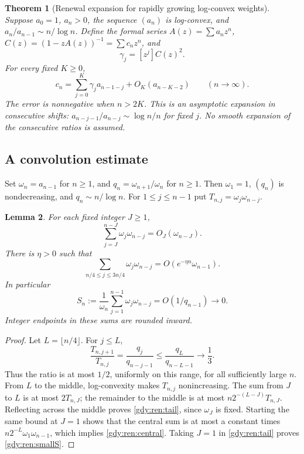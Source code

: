 \documentclass[11pt]{article}
\numberwithin{equation}{section}
\newtheorem{theorem}{Theorem}[section]
\newtheorem{lemma}[theorem]{Lemma}
\theoremstyle{definition}
\theoremstyle{remark}
\begin{document}
\begin{theorem}[Renewal expansion for rapidly growing log-convex weights]
\label{gdy:ren:theorem}
Suppose $a_0=1$, $a_n>0$, the sequence $(a_n)$ is log-convex, and
$a_n/a_{n-1}\sim n/\log n$. Define the formal series
$A(z)=\sum a_nz^n$, $C(z)=(1-zA(z))^{-1}=\sum c_nz^n$, and
\begin{equation}\label{gdy:ren:d}
 \gamma_j=[z^j]C(z)^2.
\end{equation}
For every fixed $K\ge0$,
\begin{equation}\label{gdy:ren:expansion}
 c_n=\sum_{j=0}^{K}\gamma_j a_{n-1-j}
       +O_K(a_{n-K-2})\qquad(n\to\infty).
\end{equation}
The error is nonnegative when $n>2K$. This is an asymptotic expansion
in consecutive shifts: $a_{n-j-1}/a_{n-j}\sim\log n/n$ for fixed $j$.
No smooth expansion of the consecutive ratios is assumed.
\end{theorem}

\subsection{A convolution estimate}
Set $\omega_n=a_{n-1}$ for $n\ge1$, and $q_n=\omega_{n+1}/\omega_n$ for $n\ge1$.
Then $\omega_1=1$, $(q_n)$ is nondecreasing, and $q_n\sim n/\log n$.
For $1\le j\le n-1$ put $T_{n,j}=\omega_j\omega_{n-j}$.

\begin{lemma}\label{gdy:ren:convolution}
For each fixed integer $J\ge1$,
\begin{equation}\label{gdy:ren:tail}
 \sum_{j=J}^{n-J}\omega_j\omega_{n-j}=O_J(\omega_{n-J}).
\end{equation}
There is $\eta>0$ such that
\begin{equation}\label{gdy:ren:central}
 \sum_{n/4\le j\le3n/4}\omega_j\omega_{n-j}
       =O(e^{-\eta n}\omega_{n-1}).
\end{equation}
In particular
\begin{equation}\label{gdy:ren:smallS}
 S_n:=\frac1{\omega_n}\sum_{j=1}^{n-1}\omega_j\omega_{n-j}
 =O(1/q_{n-1})\longrightarrow0.
\end{equation}
Integer endpoints in these sums are rounded inward.
\end{lemma}
\begin{proof}
Let $L=\lfloor n/4\rfloor$. For $j\le L$,
\[
 \frac{T_{n,j+1}}{T_{n,j}}
   =\frac{q_j}{q_{n-j-1}}
   \le\frac{q_L}{q_{n-L-1}}\longrightarrow\frac13.
\]
Thus the ratio is at most $1/2$, uniformly on this range, for all
sufficiently large $n$. From $L$ to the middle, log-convexity makes
$T_{n,j}$ nonincreasing. The sum from $J$ to $L$ is at most
$2T_{n,J}$; the remainder to the middle is at most
$n2^{-(L-J)}T_{n,J}$. Reflecting across the middle proves
\eqref{gdy:ren:tail}, since $\omega_J$ is fixed. Starting the same bound at $J=1$
shows that the central sum is at most a constant times
$n2^{-L}\omega_1\omega_{n-1}$, which implies \eqref{gdy:ren:central}.
Taking $J=1$ in \eqref{gdy:ren:tail} proves \eqref{gdy:ren:smallS}.
\end{proof}
\end{document}
